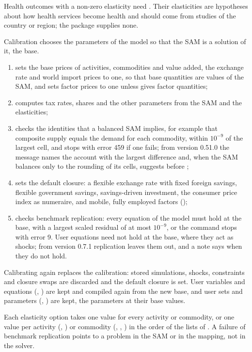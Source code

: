 Health outcomes with a non-zero elasticity need . Their
elasticities are hypotheses about how health services become health and
should come from studies of the country or region; the package supplies none.


Calibration chooses the parameters of the model so that the SAM is a solution
of it, the base. 
\begin{enumerate}
\item sets the base prices of activities, commodities and value added, the
exchange rate and world import prices to one, so that base quantities are
values of the SAM, and sets factor prices to one unless 
gives factor quantities;
\item computes tax rates, shares and the other parameters from the SAM and the
elasticities;
\item checks the identities that a balanced SAM implies, for example that
composite supply equals the demand for each commodity, within $10^{-9}$ of
the largest cell, and stops with error 459 if one fails; from version 0.51.0
the message names the account with the largest difference and, when the SAM
balances only to the rounding of its cells, suggests 
before ;
\item sets the default closure: a flexible exchange rate with fixed foreign
savings, flexible government savings, savings-driven investment, the consumer
price index as numeraire, and mobile, fully employed factors
();
\item checks benchmark replication: every equation of the model must hold at
the base, with a largest scaled residual of at most $10^{-9}$, or the command
stops with error 9. User equations need not hold at the base, where they act
as shocks; from version 0.7.1 replication leaves them out, and a note says
when they do not hold.
\end{enumerate}
Calibrating again replaces the calibration: stored simulations, shocks,
constraints and closure swaps are discarded and the default closure is set.
User variables and equations (, ) are
kept and compiled again from the new base, and user sets and parameters
(, ) are kept, the parameters at their
base values.

Each elasticity option takes one value for every activity or commodity, or one
value per activity (, ) or commodity
(, , ) in the order of the lists of
. A failure of benchmark replication points to a problem in the
SAM or in the mapping, not in the solver.

